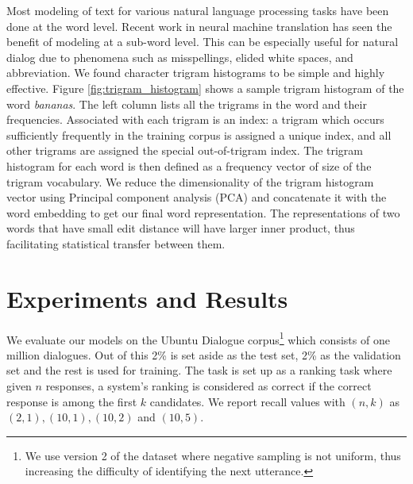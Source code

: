 \documentclass[11pt]{report}
\begin{document}
Most modeling of text for various natural language processing tasks have been done at the word level. Recent work in neural machine translation has seen the benefit of modeling at a sub-word level. This can be especially useful for natural dialog due to phenomena such as misspellings, elided white spaces, and abbreviation. We found character trigram histograms to be simple and highly effective. Figure \ref{fig:trigram_histogram} shows a sample trigram histogram of the word \textit{bananas}. The left column lists all the trigrams in the word and their frequencies.  Associated with each trigram is an index: a trigram which occurs sufficiently frequently in the training corpus is assigned a unique index, and all other trigrams are assigned the special out-of-trigram index. The trigram histogram for each word is then defined as a frequency vector of size of the trigram vocabulary.  %
We reduce the dimensionality of the trigram histogram vector using Principal component analysis (PCA) \cite{tipping1999probabilistic} and concatenate it with the word embedding to get our final word representation. The representations of two words that have small edit distance will have larger inner product, thus facilitating statistical transfer between them.

\section{Experiments and Results}\label{ubuntu_experiments_results}

We evaluate our models on the Ubuntu Dialogue corpus\footnote{We use version 2 of the dataset where negative sampling is not uniform, thus increasing the difficulty of identifying the next utterance.} which consists of one million dialogues. Out of this 2\% is set aside as the test set, 2\% as the validation set and the rest is used for training. The task is set up as a ranking task where given $n$ responses, a system's ranking is considered as correct if the correct response is among the first $k$ candidates. We report recall values with $(n,k)$ as $(2,1), (10, 1), (10, 2)$ and $(10, 5)$. 
\end{document}
